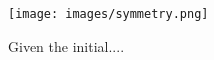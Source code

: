 \begin{figure}[t]
\centering
  \texttt{[image: images/symmetry.png]}
\caption{Given the initial....}
  \label{fig:symmetry}    
\end{figure}